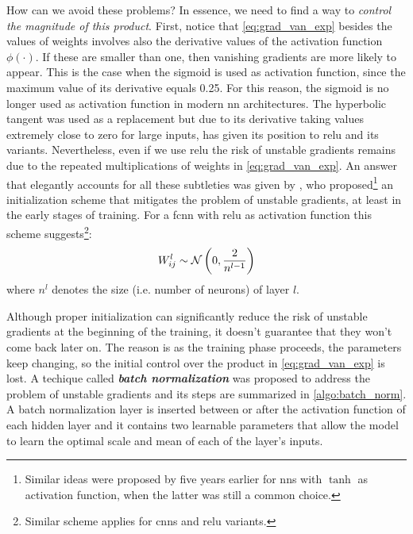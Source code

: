 How can we avoid these problems? In essence, we need to find a way to
\emph{control the magnitude of this product}. First, notice that \Equation{}
\ref{eq:grad_van_exp} besides the values of weights involves also the derivative
values of the activation function $\phi(\cdot)$. If these are smaller than one, then
vanishing gradients are more likely to appear. This is the case when the
sigmoid is used as activation function, since the maximum value
of its derivative equals \num{0.25}. For this reason, the sigmoid is no longer
used as activation function in modern \gls{nn} architectures. The hyperbolic
tangent was used as a replacement but due to its
derivative taking values extremely close to zero for large inputs, has given its
position to \gls{relu} and its variants. Nevertheless, even if we use \gls{relu}
the risk of unstable gradients remains due to the repeated multiplications of
weights in \Equation{} \ref{eq:grad_van_exp}. An answer that
elegantly accounts for all these subtleties was given by \cite{He2015}, who
proposed\footnote{Similar ideas were proposed by \cite{Glorot2010} five years
earlier for \glspl{nn} with $\tanh$ as activation function, when the latter was
still a common choice.} an initialization scheme that mitigates the problem of
unstable gradients, at least in the early stages of
training. For a \gls{fcnn} with \gls{relu} as activation function this scheme
suggests\footnote{Similar scheme applies for \glspl{cnn} and \gls{relu}
variants.}:
\begin{equation}
	\label{eq:he_initialization}
	W_{ij}^l \sim \mathcal{N}\left(0, \frac{2}{n^{l-1}}\right)
\end{equation}
where $n^{l}$ denotes the size (i.e. number of neurons) of layer $l$.

Although proper initialization can significantly reduce the risk of unstable
gradients at the beginning of the training, it doesn't guarantee that they won't
come back later on. The reason is as the training phase proceeds,
the parameters keep changing, so the initial control over the product in
\Equation{} \ref{eq:grad_van_exp} is lost. A techique called \emph{\textbf{batch
normalization}} \parencite{Ioffe2015} was proposed to
address the problem of unstable gradients and its steps are summarized in
\Algorithm{} \ref{algo:batch_norm}. A batch normalization layer is inserted between or after the activation function of
each hidden layer and it contains two learnable parameters that allow the model
to learn the optimal scale and mean of each of the layer's inputs.

